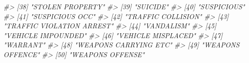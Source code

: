 \documentclass[
  12pt,
]{book}
\newenvironment{Shaded}{\begin{snugshade}}{\end{snugshade}}
\newcommand{\CommentTok}[1]{\textcolor[rgb]{0.37,0.37,0.37}{\textit{#1}}}
\begin{document}
\begin{Shaded}
\begin{Highlighting}[]
\CommentTok{\#> [38] "STOLEN PROPERTY"                           }
\CommentTok{\#> [39] "SUICIDE"                                   }
\CommentTok{\#> [40] "SUSPICIOUS"                                }
\CommentTok{\#> [41] "SUSPICIOUS OCC"                            }
\CommentTok{\#> [42] "TRAFFIC COLLISION"                         }
\CommentTok{\#> [43] "TRAFFIC VIOLATION ARREST"                  }
\CommentTok{\#> [44] "VANDALISM"                                 }
\CommentTok{\#> [45] "VEHICLE IMPOUNDED"                         }
\CommentTok{\#> [46] "VEHICLE MISPLACED"                         }
\CommentTok{\#> [47] "WARRANT"                                   }
\CommentTok{\#> [48] "WEAPONS CARRYING ETC"                      }
\CommentTok{\#> [49] "WEAPONS OFFENCE"                           }
\CommentTok{\#> [50] "WEAPONS OFFENSE"}
\end{Highlighting}
\end{Shaded}
\end{document}
